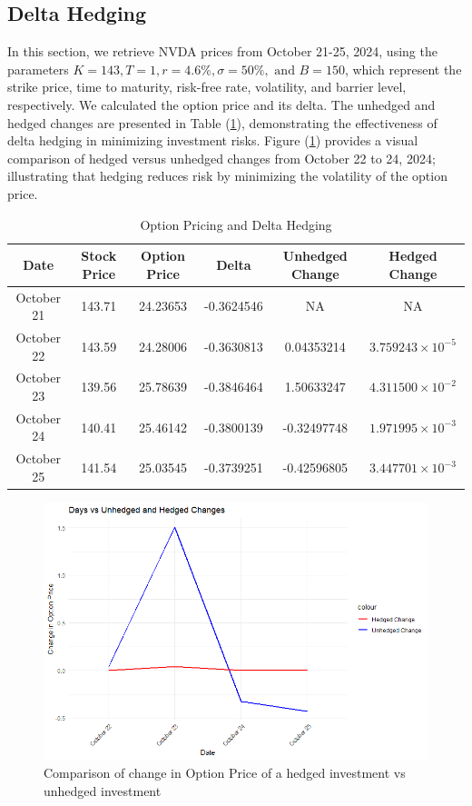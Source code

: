 \subsection{Delta Hedging}

In this section, we retrieve NVDA prices from October 21-25, 2024, using the parameters $K = 143, T = 1, r = 4.6\%, \sigma = 50\%, \text{ and } B = 150$, which represent the strike price, time to maturity, risk-free rate, volatility, and barrier level, respectively. We calculated the option price and its delta. The unhedged and hedged changes are presented in Table (\ref{tab:hedging}), demonstrating the effectiveness of delta hedging in minimizing investment risks. Figure (\ref{fig:hedgingvunhedging}) provides a visual comparison of hedged versus unhedged changes from October 22 to 24, 2024; illustrating that hedging reduces risk by minimizing the volatility of the option price.

\begin{table}[h]
    \centering
    \caption{Option Pricing and Delta Hedging}
    \label{tab:hedging}
    \begin{tabular}{|c|c|c|c|c|c|}
        \hline
        \textbf{Date} & \textbf{Stock Price} & \textbf{Option Price} & \textbf{Delta} & \textbf{Unhedged Change} & \textbf{Hedged Change} \\
        \hline
        October 21 & 143.71 & 24.23653 & -0.3624546 & NA & NA \\
        \hline
        October 22 & 143.59 & 24.28006 & -0.3630813 & 0.04353214 & $3.759243 \times 10^{-5}$ \\
        \hline
        October 23 & 139.56 & 25.78639 & -0.3846464 & 1.50633247 & $4.311500 \times 10^{-2}$ \\
        \hline
        October 24 & 140.41 & 25.46142 & -0.3800139 & -0.32497748 & $1.971995 \times 10^{-3}$ \\
        \hline
        October 25 & 141.54 & 25.03545 & -0.3739251 & -0.42596805 & $3.447701 \times 10^{-3}$ \\
        \hline
    \end{tabular}
\end{table}

\begin{figure}[h]
    \centering
    \includegraphics[width=0.65\linewidth]{content/images/hedgedvsunhedged.png}
    \caption{Comparison of change in Option Price of a hedged investment vs unhedged investment}
    \label{fig:hedgingvunhedging}
\end{figure}

